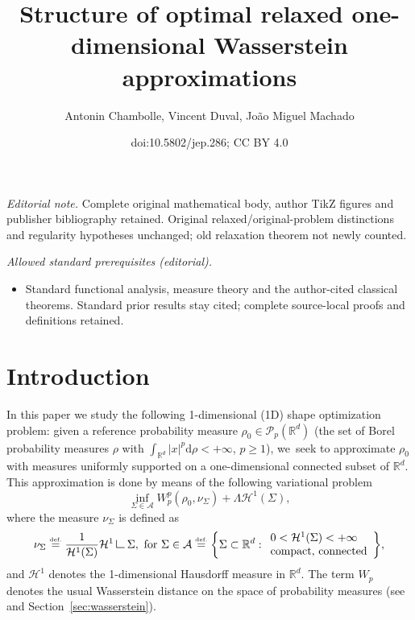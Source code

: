 \documentclass[10pt]{amsart}
\title{Structure of optimal relaxed one-dimensional Wasserstein approximations}
\author{Antonin Chambolle, Vincent Duval, João Miguel Machado}
\date{doi:10.5802/jep.286; CC BY 4.0}
\theoremstyle{definition}
\newcommand{\eqdef}{\ensuremath{\stackrel{\mbox{\upshape\tiny def.}}{=}}}
\newcommand\LM[1]{\hbox{\vrule width.5pt \vbox to#1pt{\vfill \hrule width#1pt height.5pt}}}
\newcommand\LL{{\mathchoice {\>\LM7\>}{\>\LM7\>}{\,\LM5\,}{\,\LM{3.35}\,}}}
\newcommand{\mres}{\LL}
\newcommand\cH{\mathcal{H}}
\newcommand{\RR}{\mathbb{R}}
\newcommand\dd{\mathrm{d}}
\begin{document}
\maketitle
\noindent\textit{Editorial note.} Complete original mathematical body, author TikZ figures and publisher bibliography retained. Original relaxed/original-problem distinctions and regularity hypotheses unchanged; old relaxation theorem not newly counted.\par\medskip
\noindent\textit{Allowed standard prerequisites (editorial).}\begin{itemize}
\item Standard functional analysis, measure theory and the author-cited classical theorems. Standard prior results stay cited; complete source-local proofs and definitions retained.
\end{itemize}\medskip

\vspace*{-1.5\baselineskip}
\tableofcontents


\section{Introduction}\label{section.introduction}
In this paper we study the following 1-dimensional (1D) shape optimization
problem: given a reference probability measure
$\rho_0 \in \mathcal{P}_p(\RR^d)$ (the set of
Borel probability measures $\rho$ with $\int_{\RR^d}|x|^p \dd \rho<+\infty$, $p\ge 1$), we~seek to approximate $\rho_0$ with measures uniformly supported on a one-dimensional connected subset of $\RR^d$.
This approximation is done by means of the following variational problem
\begin{equation}
\label{problem.shape_optimization}
\tag{$P_\Lambda$}
\inf_{\Sigma \in \mathcal{A}}
W_p^p(\rho_0, \nu_{\Sigma}) + \Lambda \cH^1(\Sigma),
\end{equation}
where the measure $\nu_{\Sigma}$ is defined as
\begin{equation}\label{admissible_set}
\nu_{\Sigma} \eqdef \frac{1}{\cH^1(\Sigma)} \cH^1\mres \Sigma, \text{ for } \Sigma \in
\mathcal{A}\eqdef
\biggl\{
\Sigma \subset \RR^d :
\begin{array}{l}
0 < \mathcal{H}^1(\Sigma) < +\infty \\
\text{compact, connected}
\end{array}
\biggr\},
\end{equation}
and $\mathcal{H}^1$ denotes the 1-dimensional Hausdorff measure in $\RR^d$. The term $W_p$ denotes the usual Wasserstein distance on the space of probability measures (see~\cite{santambrogio2015optimal,villani2009optimal}
and Section~\ref{sec:wasserstein}).
\end{document}
